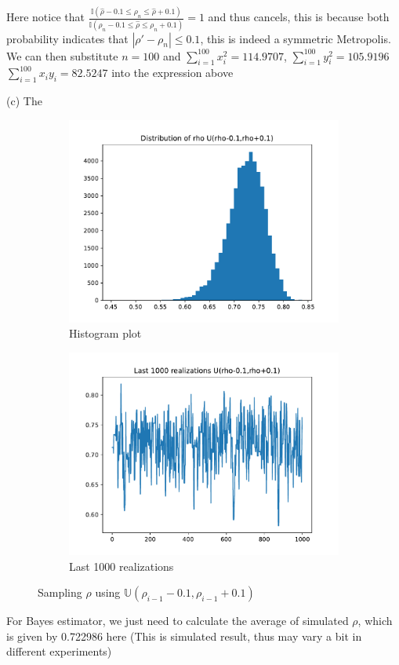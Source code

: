 \documentclass{homeworg}
\begin{document}
Here notice that $\frac{\mathbb{I}(\hat{\rho}-0.1\leq \rho_n\leq \hat{\rho}+0.1)}{\mathbb{I}(\rho_n-0.1\leq \hat{\rho}\leq \rho_n+0.1)}=1$ and thus cancels, this is because both probability indicates that $|\rho'-\rho_n|\leq 0.1$, this is indeed a symmetric Metropolis. We can then substitute $n=100$ and $\sum_{i=1}^{100}x_i^2=114.9707$,  $\sum_{i=1}^{100} y_i^2=105.9196$ $\sum_{i=1}^{100}x_iy_i=82.5247$ into the expression above

(c) The 
\begin{figure}[h]
	\centering
	\begin{subfigure}[b]{0.48\textwidth}
		\centering
		\includegraphics[width=\textwidth]{q1_partc1.pdf}
		\caption{Histogram plot}
	\end{subfigure}
	\hfill
	\begin{subfigure}[b]{0.48\textwidth}
		\centering
		\includegraphics[width=\textwidth]{q1_partc2.pdf}
		\caption{Last 1000 realizations}
	\end{subfigure}
	\caption{Sampling $\rho$ using $\mathbb{U}(\rho_{i-1}-0.1,\rho_{i-1}+0.1)$}
\end{figure}
For Bayes estimator, we just need to calculate the average of simulated $\rho$, which is given by 0.722986 here (This is simulated result, thus may vary a bit in different experiments)
\end{document}

